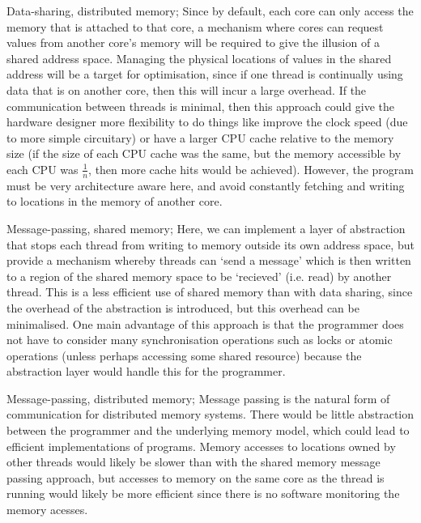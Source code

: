 \documentclass{report}
\begin{document}
\begin{enumerate}
\begin{enumerate}
    Data-sharing, distributed memory; Since by default, each core can
    only access the memory that is attached to that core, a mechanism
    where cores can request values from another core's memory will be
    required to give the illusion of a shared address space. Managing
    the physical locations of values in the shared address will be a
    target for optimisation, since if one thread is continually using
    data that is on another core, then this will incur a large
    overhead. If the communication between threads is minimal, then
    this approach could give the hardware designer more flexibility to
    do things like improve the clock speed (due to more simple
    circuitary) or have a larger CPU cache relative to the memory size
    (if the size of each CPU cache was the same, but the memory
    accessible by each CPU was $\frac{1}{n}$, then more cache hits
    would be achieved). However, the program must be very architecture
    aware here, and avoid constantly fetching and writing to locations
    in the memory of another core.

    Message-passing, shared memory; Here, we can implement a layer of
    abstraction that stops each thread from writing to memory outside
    its own address space, but provide a mechanism whereby threads can
    `send a message' which is then written to a region of the shared
    memory space to be `recieved' (i.e. read) by another thread. This
    is a less efficient use of shared memory than with data sharing,
    since the overhead of the abstraction is introduced, but this
    overhead can be minimalised. One main advantage of this approach
    is that the programmer does not have to consider many synchronisation
    operations such as locks or atomic operations (unless perhaps
    accessing some shared resource) because the abstraction layer
    would handle this for the programmer.

    Message-passing, distributed memory; Message passing is the
    natural form of communication for distributed memory
    systems. There would be little abstraction between the programmer
    and the underlying memory model, which could lead to efficient
    implementations of programs. Memory accesses to locations owned by
    other threads would likely be slower than with the shared memory message
    passing approach, but accesses to memory on the same core as the
    thread is running would likely be more efficient since there is no
    software monitoring the memory acesses.


\end{enumerate}
\end{enumerate}
\end{document}
